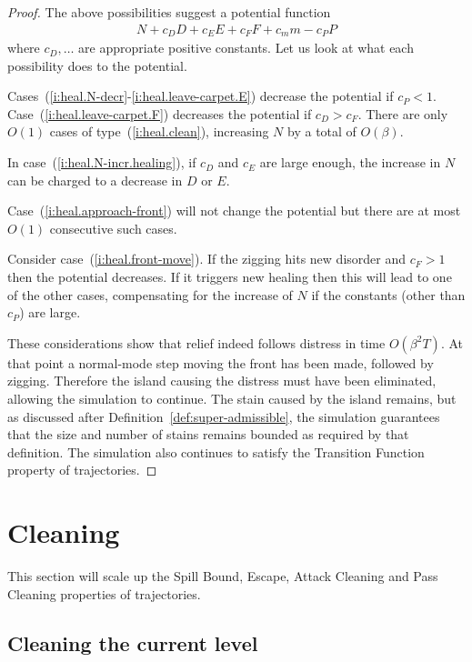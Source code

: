 \documentclass[11pt]{memoir}
\theoremstyle{definition} %
\newcommand{\Tu}{T}
\begin{document}
\begin{proof}
The above possibilities suggest a potential function
\begin{align*}
   N + c_{D}D + c_{E}E + c_{F}F + c_{m}m - c_{P}P
 \end{align*}
where \( c_{D},\dots \) are appropriate positive constants.
Let us look at what each possibility does to the potential.

Cases~(\ref{i:heal.N-decr}-\ref{i:heal.leave-carpet.E}) decrease the potential if \( c_{P}<1 \).
Case~(\ref{i:heal.leave-carpet.F}) decreases the potential if \( c_{D}>c_{F} \).
There are only \( O(1) \) cases of type~(\ref{i:heal.clean}), increasing \( N \) by a total of \( O(\beta) \).

In case~(\ref{i:heal.N-incr.healing}), if \( c_{D} \) and \( c_{E} \) are large enough,
the increase in \( N \) can be charged to a decrease in \( D \) or \( E \).

Case~(\ref{i:heal.approach-front}) will not change the potential but there are at most \( O(1) \)
consecutive such cases.
 
Consider case~(\ref{i:heal.front-move}).
If the zigging hits new disorder and \( c_{F}>1 \) then the potential decreases.
If it triggers new healing then this will lead to one of the other cases,
compensating for the increase of \( N \) if the constants (other than \( c_{P} \)) are large.

These considerations show that relief indeed follows distress in time \( O(\beta^{2}\Tu) \).
At that point a normal-mode step moving the front has been made, followed by zigging.
Therefore the island causing the distress must have been eliminated, allowing the 
simulation to continue.
The stain caused by the island remains, but as discussed after Definition~\ref{def:super-admissible},
the simulation guarantees that the
size and number of stains remains bounded as required by that definition.
The simulation also continues to satisfy the Transition Function property of trajectories.
\end{proof}

\section{Cleaning}\label{sec:cleaning}

This section will scale up the Spill Bound, Escape, Attack Cleaning
and Pass Cleaning properties of trajectories.

\subsection{Cleaning the current level}
\end{document}
